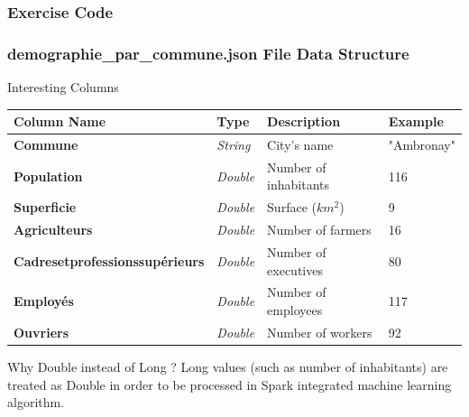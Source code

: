 \documentclass[slidetop,9pt,utf8]{beamer}
\begin{document}
\begin{frame}
  \frametitle{Exercise Code}

  

\end{frame}

\begin{frame}

  \frametitle{demographie\_par\_commune.json File Data Structure}

  \begin{block}{Interesting Columns}
    \begin{tabular}{|l|l|l|l|}
          \hline 
          \rowcolor{gray} \textbf{Column Name} & \textbf{Type} & \textbf{Description} & \textbf{Example} \\ \hline
          \textbf{Commune} & \textit{String} & City's name & "Ambronay" \\ \hline
          \textbf{Population} & \textit{Double} & Number of inhabitants & 116 \\ \hline
          \textbf{Superficie} & \textit{Double} & Surface ($km^{2}$) & 9 \\ \hline
          \textbf{Agriculteurs} & \textit{Double} & Number of farmers & 16 \\ \hline
          \textbf{Cadresetprofessionssupérieurs} & \textit{Double} & Number of executives & 80 \\ \hline
          \textbf{Employés} & \textit{Double} & Number of employees & 117 \\ \hline
          \textbf{Ouvriers} & \textit{Double} & Number of workers & 92 \\ \hline
    \end{tabular}
  \end{block}

  \begin{block}{Why Double instead of Long ?}
    Long values (such as number of inhabitants) are treated as Double in order to be processed in Spark integrated machine learning algorithm.
  \end{block}

\end{frame}
\end{document}
